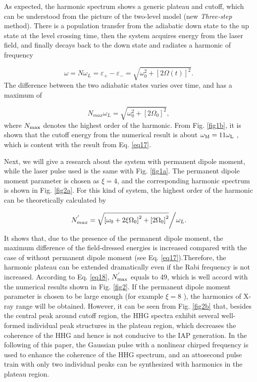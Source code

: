 \documentclass[10pt,letterpaper]{article}
\begin{document}
As expected, the harmonic spectrum shows a generic plateau and cutoff, which can be understood from the picture of the two-level model (new \emph{Three-step} method). There is a population transfer from the adiabatic down state to the up state at the level crossing time, then the system acquires energy from the laser field, and finally decays back to the down state and radiates a harmonic of frequency

\begin{equation}
\omega  = N{\omega _L} = {\varepsilon _ + } - {\varepsilon _ - } = \sqrt {\omega _0^2 + {{\left[ {2\Omega \left( t \right)} \right]}^2}} .
\label{eq16}
\end{equation}
The difference between the two adiabatic states varies over time, and has a maximum of 

\begin{equation}
{N_{max }}{\omega _L} = \sqrt {\omega _0^2 + {{\left[ {2{\Omega _0}} \right]}^2}} ,
\label{eq17}
\end{equation}
where $ N_{\rm{max}} $ denotes the highest order of the harmonic. From Fig. \ref{fig1b}, it is shown that the cutoff energy from the numerical result is about $ \omega_{\rm{M}}=11\omega_{\rm{L}} $ , which is content with the result from Eq. \ref{eq17}.

Next, we will give a research about the system with permanent dipole moment, while the laser pulse used is the same with Fig. \ref{fig1a}. The permanent dipole moment parameter is chosen as $ \xi=4 $, and the corresponding harmonic spectrum is shown in Fig. \ref{fig2a}. For this kind of system, the highest order of the harmonic can be theoretically calculated by

\begin{equation}
N_{max }^{'} = {{\sqrt {{{\left[ {{\omega _0} + 2\xi {\Omega _0}} \right]}^2} + {{\left[ {2{\Omega _0}} \right]}^2}} } \mathord{\left/
		{\vphantom {{\sqrt {{{\left[ {{\omega _0} + 2\xi {\Omega _0}} \right]}^2} + {{\left[ {2{\Omega _0}} \right]}^2}} } {{\omega _L}}}} \right.
		\kern-\nulldelimiterspace} {{\omega _L}}}.
\label{eq18}
\end{equation}
It shows that, due to the presence of the permanent dipole moment, the maximum difference of the field-dressed energies is increased compared with the case of without permanent dipole moment (see Eq. \ref{eq17}).Therefore, the harmonic plateau can be extended dramatically even if the Rabi frequency is not increased. According to Eq. \ref{eq18}, $ N_{\rm{max}}^{'}$ equals to 49, which is well accord with the numerical results shown in Fig. \ref{fig2}. If the permanent dipole moment parameter is chosen to be large enough (for example $ \xi=8 $ ), the harmonics of X-ray range will be obtained. However, it can be seen from Fig. \ref{fig2b} that, besides the central peak around cutoff region, the HHG spectra exhibit several well-formed individual peak structures in the plateau region, which decreases the coherence of the HHG and hence is not conducive to the IAP generation. In the following of this paper, the Gaussian pulse with a nonlinear chirped frequency is used to enhance the coherence of the HHG spectrum, and an attosecond pulse train with only two individual peaks can be synthesized with harmonics in the plateau region. 
\end{document}
